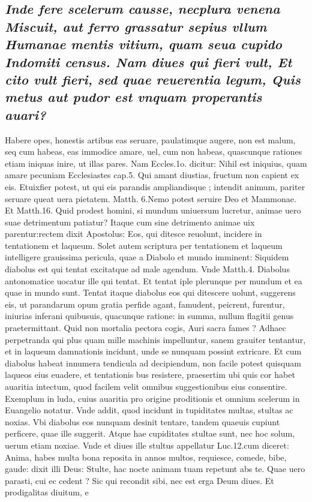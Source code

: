 \documentclass{article}
\begin{document}
\begin{pages}
\subsection*{\textit{Inde fere scelerum causse, necplura venena Miscuit, aut ferro grassatur sepius vllum Humanae mentis vitium, quam seua cupido Indomiti census. Nam diues qui fieri vult, Et cito vult fieri, sed quae reuerentia legum, Quis metus aut pudor est vnquam properantis auari? }}\pstart Habere opes, honestis artibus eas seruare, paulatimque augere, non est malum, seq cum habeas, eas immodice amare, uel, cum non habeas, quascunque rationes etiam iniquas inire, ut illas pares. Nam Eccles.1o. dicitur: Nihil est iniquius, quam amare pecuniam Ecclesiastes cap.5. Qui amant diustias, fructum non capient ex eis. Etuixfier potest, ut qui eis parandis ampliandisque ; intendit animum, pariter seruare queat uera pietatem. Matth. 6.Nemo potest seruire Deo et Mammonae. Et Matth.16. Quid prodest homini, si mundum uniuersum lucretur, animae uero suae detrimentum patiatur? Itaque cum sine detrimento animae uix parentur:rectem dixit Apostolus: Eos, qui ditesce reuolunt, incidere in tentationem et laqueum. Solet autem scriptura per tentationem et laqueum intelligere grauissima pericula, quae a Diabolo et mundo imminent: Siquidem diabolus est qui tentat excitatque ad male agendum. Vnde Matth.4. Diabolus antonomatice uocatur ille qui tentat. Et tentat iple plerunque per mundum et ea quae in mundo sunt. Tentat itaque diabolus eos qui ditescere uolunt, suggerens eis, ut parandarum opum gratia perfide agant, famudent, peicrent, furentur, iniurias inferani quibusuis, quacunque ratione: in summa, nullum flagitii genus praetermittant. Quid non mortalia pectora cogis, Auri sacra fames ? Adhaec perpetranda qui plus quam mille machinis impelluntur, sanem grauiter tentantur, et in laqueum damnationis incidunt, unde se nunquam possint extricare. Et cum diabolus habeat innumera tendicula ad decipiendum, non facile potest quisquam laqueos eius euadere, et tentationis bus resistere, praesertim ubi quis cor habet auaritia intectum, quod facilem velit omnibus suggestionibus eius consentire. Exemplum in luda, cuius auaritia pro origine proditionis et omnium scelerum in Euangelio notatur. Vnde addit, quod incidunt in tupiditates multas, stultas ac noxias. Vbi diabolus eos nunquam desinit tentare, tandem quaeuis cupiunt perficere, quae ille suggerit. Atque hae cupiditates stultae sunt, nec hoc solum, uerum etiam noxiae. Vnde et diues ille stultus appellatur Luc.12.cum diceret: Anima, habes multa bona reposita in annos multos, requiesce, comede, bibe, gaude:  dixit illi Deus: Stulte, hac nocte animam tuam repetunt abs te. Quae uero parasti, cui ec cedent ? Sic qui recondit sibi, nec est erga Deum diues. Et prodigalitas diuitum, e  \pend

\end{pages}
\end{document}
